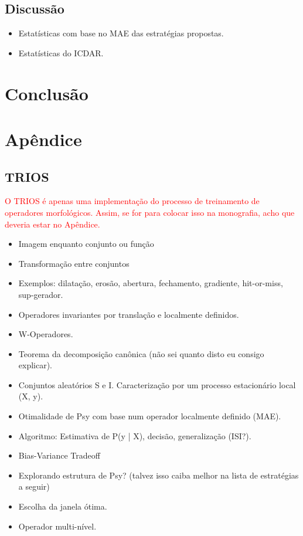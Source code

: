 \documentclass[a4paper,11pt]{article}
\newcommand{\TODO}[1]{\textcolor{red}{#1}}
\begin{document}
\subsection{Discussão}

      \begin{itemize}
        \item Estatísticas com base no MAE das estratégias propostas.
        \item Estatísticas do ICDAR.
      \end{itemize}



\section{Conclusão}




\section{Apêndice}

\subsection{TRIOS}

\TODO{O TRIOS é apenas uma implementação do processo de treinamento de
  operadores morfológicos. Assim, se for para colocar isso na
  monografia, acho que deveria estar no Apêndice.}
      \begin{itemize}
        \item Imagem enquanto conjunto ou função
        \item Transformação entre conjuntos
        \item Exemplos: dilatação, erosão, abertura, fechamento, gradiente, hit-or-miss, sup-gerador.
        \item Operadores invariantes por translação e localmente definidos.
        \item W-Operadores.
        \item Teorema da decomposição canônica (não sei quanto disto eu consigo explicar).
        \item Conjuntos aleatórios S e I. Caracterização por um processo estacionário local (X, y).
        \item Otimalidade de Psy com base num operador localmente definido (MAE).
        \item Algoritmo: Estimativa de P(y | X), decisão, generalização (ISI?).
        \item Bias-Variance Tradeoff
        \item Explorando estrutura de Psy? (talvez isso caiba melhor na lista de estratégias a seguir)
        \item Escolha da janela ótima.
        \item Operador multi-nível.
      \end{itemize}
\end{document}
